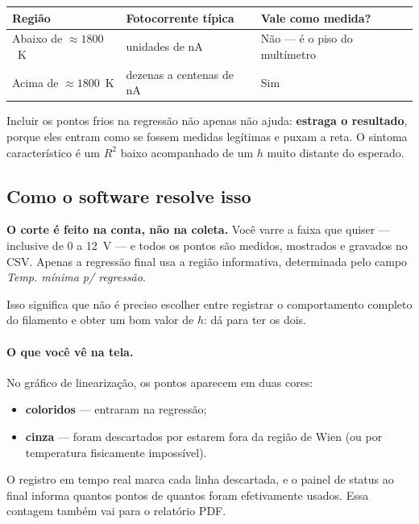 \documentclass[11pt,a4paper]{article}
\newcommand{\campo}[1]{\textsf{\textit{#1}}}
\begin{document}
\begin{center}
\begin{tabular}{@{}lll@{}}
\toprule
\textbf{Região} & \textbf{Fotocorrente típica} & \textbf{Vale como medida?} \\
\midrule
Abaixo de $\approx 1800$~K & unidades de nA & Não --- é o piso do multímetro \\
Acima de $\approx 1800$~K & dezenas a centenas de nA & Sim \\
\bottomrule
\end{tabular}
\end{center}

Incluir os pontos frios na regressão não apenas não ajuda: \textbf{estraga o
resultado}, porque eles entram como se fossem medidas legítimas e puxam a
reta. O sintoma característico é um $R^2$ baixo acompanhado de um $h$ muito
distante do esperado.

\subsection{Como o software resolve isso}

\textbf{O corte é feito na conta, não na coleta.} Você varre a faixa que
quiser --- inclusive de 0 a 12~V --- e todos os pontos são medidos, mostrados e
gravados no CSV. Apenas a regressão final usa a região informativa,
determinada pelo campo \campo{Temp. mínima p/ regressão}.

Isso significa que não é preciso escolher entre registrar o comportamento
completo do filamento e obter um bom valor de $h$: dá para ter os dois.

\paragraph{O que você vê na tela.}
No gráfico de linearização, os pontos aparecem em duas cores:

\begin{itemize}[nosep]
  \item \textbf{coloridos} --- entraram na regressão;
  \item \textbf{cinza} --- foram descartados por estarem fora da região de
        Wien (ou por temperatura fisicamente impossível).
\end{itemize}

O registro em tempo real marca cada linha descartada, e o painel de status ao
final informa quantos pontos de quantos foram efetivamente usados. Essa
contagem também vai para o relatório PDF.
\end{document}
